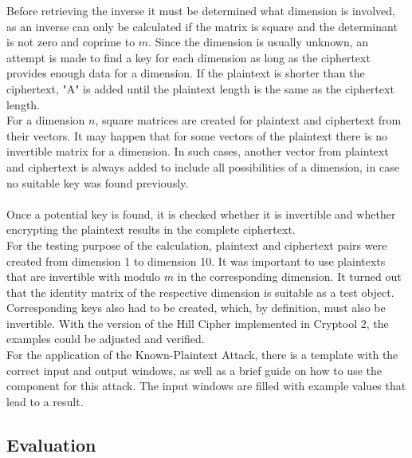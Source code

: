 \documentclass[conference]{IEEEtran}
\begin{document}
Before retrieving the inverse it must be determined what dimension is involved, as an inverse can only be calculated if the matrix is square and the determinant is not zero and coprime to \(m\). Since the dimension is usually unknown, an attempt is made to find a key for each dimension as long as the ciphertext provides enough data for a dimension. If the plaintext is shorter than the ciphertext, "A" is added until the plaintext length is the same as the ciphertext length.
\\
For a dimension \(n\), square matrices are created for plaintext and ciphertext from their vectors. It may happen that for some vectors of the plaintext there is no invertible matrix for a dimension. In such cases, another vector from plaintext and ciphertext is always added to include all possibilities of a dimension, in case no suitable key was found previously.
\\\\
Once a potential key is found, it is checked whether it is invertible and whether encrypting the plaintext results in the complete ciphertext.
\\
For the testing purpose of the calculation, plaintext and ciphertext pairs were created from dimension 1 to dimension 10. It was important to use plaintexts that are invertible with modulo \(m\) in the corresponding dimension. It turned out that the identity matrix of the respective dimension is suitable as a test object. Corresponding keys also had to be created, which, by definition, must also be invertible. With the version of the Hill Cipher implemented in Cryptool 2, the examples could be adjusted and verified.
\\
For the application of the Known-Plaintext Attack, there is a template with the correct input and output windows, as well as a brief guide on how to use the component for this attack. The input windows are filled with example values that lead to a result.
\\

\subsection{Evaluation}
\end{document}
